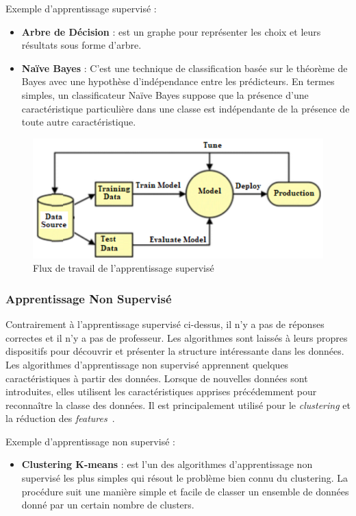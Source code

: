 Exemple d'apprentissage supervisé :
\begin{itemize}
	\item \textbf{Arbre de Décision} : est un graphe pour représenter les choix et leurs résultats sous forme d'arbre.
	\item \textbf{Naïve Bayes} : C'est une technique de classification basée sur le théorème de Bayes avec une hypothèse d'indépendance entre les prédicteurs. En termes simples, un classificateur Naïve Bayes suppose que la présence d'une caractéristique particulière dans une classe est indépendante de la présence de toute autre caractéristique.
\end{itemize}
\begin{figure}[!h]
	\centering
	\includegraphics[width=0.6\linewidth]{images/supervisedlearning}
	\caption{Flux de travail de l'apprentissage supervisé}
	\label{fig:suppervisedlearning}
\end{figure}
\newpage
\subsubsection{Apprentissage Non Supervisé}
Contrairement à l'apprentissage supervisé ci-dessus, il n'y a pas de réponses correctes et il n'y a pas de professeur. Les algorithmes sont laissés à leurs propres dispositifs pour découvrir et présenter la structure intéressante dans les données. Les algorithmes d'apprentissage non supervisé apprennent quelques caractéristiques à partir des données. Lorsque de nouvelles données sont introduites, elles utilisent les caractéristiques apprises précédemment pour reconnaître la classe des données. Il est principalement utilisé pour le \textit{clustering} et la réduction des \textit{features}~\cite{Machine2020Batta}.

Exemple d'apprentissage non supervisé :
\begin{itemize}
	\item \textbf{Clustering K-means} : est l'un des algorithmes d'apprentissage non supervisé les plus simples qui résout le problème bien connu du clustering. La procédure suit une manière simple et facile de classer un ensemble de données donné par un certain nombre de clusters.
\end{itemize}


